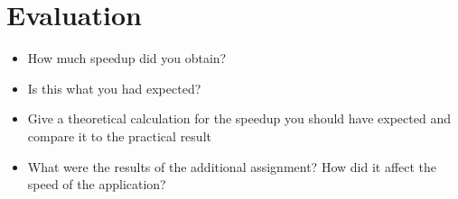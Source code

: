 
\section{Evaluation}

\begin{itemize}
	\item How much speedup did you obtain?
	\item Is this what you had expected?
	\item Give a theoretical calculation for the speedup you should have expected and compare it to the practical result
	\item What were the results of the additional assignment? How did it affect the speed of the application?
\end{itemize}


